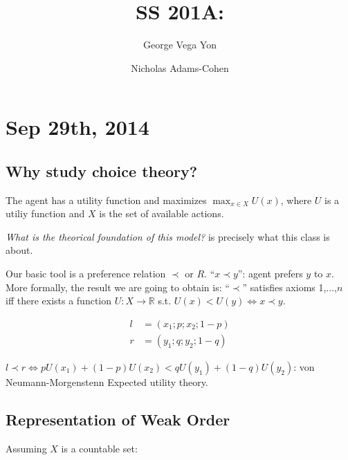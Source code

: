 \documentclass{article}
\title{SS 201A: }
\author{George Vega Yon\and Nicholas Adams-Cohen}
\def\reals{\mathbb{R}}
\begin{document}
\maketitle

\section*{Sep 29th, 2014}

\subsection*{Why study choice theory?}

The agent has a utility function and maximizes $\max_{x\in X}U(x)$, where $U$ is
a utiliy function and $X$ is the set of available actions.

\emph{What is the theorical foundation of this model?} is precisely what this
class is about.

Our basic tool is a preference relation $\prec$ or $R$. ``$x\prec y$'': agent 
prefers $y$ to $x$. More formally, the result we are going to obtain is: 
``$\prec$'' satisfies  axioms 1,...,$n$ iff there exists a function 
$U:X\to\reals$ s.t. $U(x)<U(y) \iff x\prec y$.

\begin{align*}
l&=(x_1;p;x_2;1-p) \\
r&=(y_1;q;y_2;1-q)
\end{align*}

$l\prec r \iff pU(x_1) + (1-p)U(x_2) < qU(y_1) + (1-q)U(y_2)$: von 
Neumann-Morgenstenn Expected utility theory.

\subsection*{Representation of Weak Order}

Assuming $X$ is a countable set:
\end{document}
